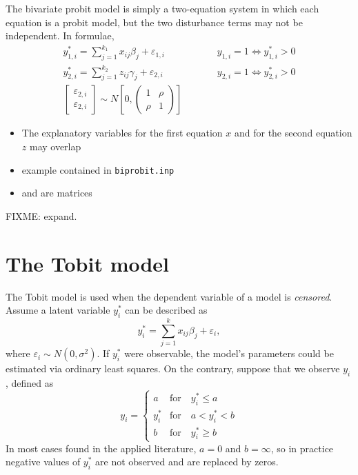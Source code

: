 The bivariate probit model is simply a two-equation system in which
each equation is a probit model, but the two disturbance terms may not
be independent. In formulae,
\begin{eqnarray}
  y^*_{1,i} = \sum_{j=1}^{k_1} x_{ij} \beta_j + \varepsilon_{1,i}  & \qquad &
  y_{1,i}=1  \Longleftrightarrow y^*_{1,i}>0 \\
  y^*_{2,i} = \sum_{j=1}^{k_2} z_{ij} \gamma_j + \varepsilon_{2,i} & \qquad &
  y_{2,i}=1  \Longleftrightarrow y^*_{2,i}>0 \\
  \left[ \begin{array}{c}
      \varepsilon_{2,i} \\ \varepsilon_{2,i}
    \end{array} \right] \sim 
  N \left[ 0, \left( \begin{array}{cc}
      1 & \rho \\ \rho & 1
    \end{array} \right) \right] 
\end{eqnarray}

\begin{itemize}
\item The explanatory variables for the first equation $x$ and for the
  second equation $z$ may overlap
\item example contained in \texttt{biprobit.inp}
\item {} and  are matrices
\end{itemize}

FIXME: expand.


\section{The Tobit model}
\label{sec:tobit}

The Tobit model is used when the dependent variable of a model is
\emph{censored}. Assume a latent variable $y^*_i$ can be described
as
\[
  y^*_i = \sum_{j=1}^k x_{ij} \beta_j + \varepsilon_i ,
\]
where $\varepsilon_i \sim N(0,\sigma^2)$. If $y^*_i$ were observable,
the model's parameters could be estimated via ordinary least squares.
On the contrary, suppose that we observe $y_i$, defined as
%
\begin{equation}
  \label{eq:tobit}
  y_i = \left\{ 
    \begin{array}{ll}
      a & \mathrm{for} \quad y^*_i \le a \\
      y^*_i & \mathrm{for} \quad a < y^*_i < b \\ 
      b & \mathrm{for} \quad y^*_i \ge b 
    \end{array}
    \right. 
\end{equation}
In most cases found in the applied literature, $a=0$ and $b=\infty$,
so in practice negative values of $y^*_i$ are not observed and are
replaced by zeros.

